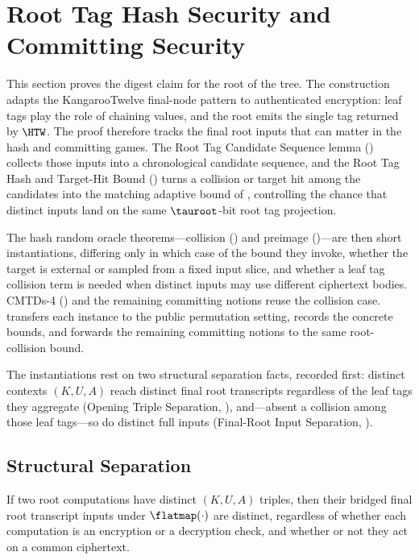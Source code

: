 \section{Root Tag Hash Security and Committing Security}
\label{sec:root-tag-hash-security}

This section proves the digest claim for the root of the \TW{} tree. The
construction adapts the KangarooTwelve final-node pattern to authenticated
encryption: leaf tags play the role of chaining values, and the root emits the
single tag returned by $\HTW$. The proof therefore tracks the final root inputs
that can matter in the hash and committing games. The Root Tag Candidate
Sequence lemma () collects those inputs into a
chronological candidate sequence, and the Root Tag Hash and Target-Hit Bound
() turns a collision or target hit among the
candidates into the matching adaptive bound of , controlling
the chance that distinct inputs land on the same $\tauroot$-bit root tag
projection.

The hash random oracle theorems---collision () and
preimage ()---are then short instantiations,
differing only in which case of the bound they invoke, whether the target is
external or sampled from a fixed input slice, and whether a leaf tag collision
term is needed when distinct inputs may use different ciphertext bodies. CMTDs-4
() and the remaining committing notions reuse the collision
case.
 transfers each instance to the public
permutation setting,  records the concrete bounds,
and  forwards the remaining \cite{BH22}
committing notions to the same root-collision bound.

The instantiations rest on two structural separation facts, recorded
first: distinct contexts $(K, U, A)$ reach distinct final root
transcripts regardless of the leaf tags they aggregate (Opening Triple
Separation, ), and---absent a collision among those
leaf tags---so do distinct full inputs (Final-Root Input Separation,
).

\subsection{Structural Separation}

\begin{proposition}
\label{cor:triple-sep}
If two \TW{} root computations have distinct $(K, U, A)$ triples, then
their bridged final root transcript inputs under $\flatmap(\cdot)$ are
distinct, regardless of whether each computation is an encryption or
a decryption check, and whether or not they act on a common ciphertext.
\end{proposition}

